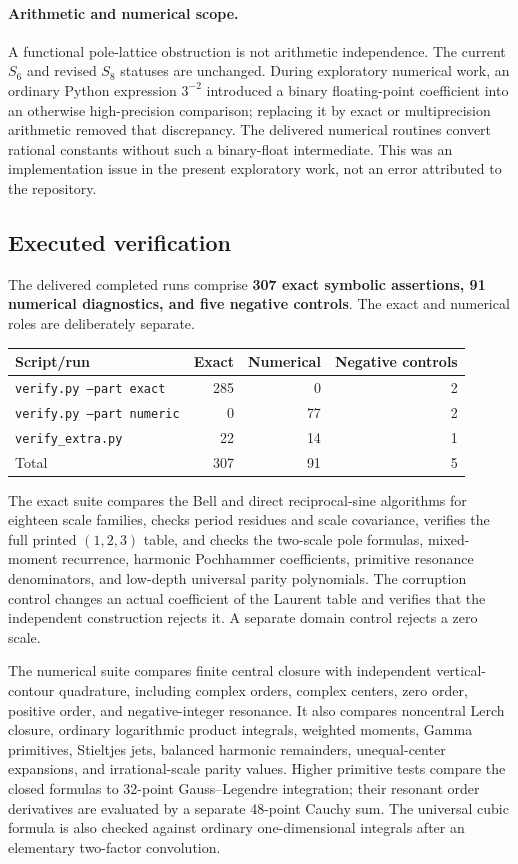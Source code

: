 \documentclass[11pt,a4paper]{article}
\numberwithin{equation}{section}
\theoremstyle{definition}\newtheorem{definition}[theorem]{Definition}
\theoremstyle{remark}\newtheorem{remark}[theorem]{Remark}
\begin{document}
\paragraph{Arithmetic and numerical scope.}
A functional pole-lattice obstruction is not arithmetic independence.
The current $S_6$ and revised $S_8$ statuses are unchanged. During
exploratory numerical work, an ordinary Python expression $3^{-2}$
introduced a binary floating-point coefficient into an otherwise
high-precision comparison; replacing it by exact or multiprecision
arithmetic removed that discrepancy. The delivered numerical routines
convert rational constants without such a binary-float intermediate.
This was an implementation issue in the present exploratory work, not
an error attributed to the repository.

\subsection{Executed verification}
The delivered completed runs comprise \textbf{307 exact symbolic
assertions, 91 numerical diagnostics, and five negative controls}.
The exact and numerical roles are deliberately separate.
\begin{center}
\begin{tabular}{l r r r}
\toprule
Script/run & Exact & Numerical & Negative controls\\
\midrule
\texttt{verify.py --part exact} & 285 & 0 & 2\\
\texttt{verify.py --part numeric} & 0 & 77 & 2\\
\texttt{verify\_extra.py} & 22 & 14 & 1\\
\midrule
Total & 307 & 91 & 5\\
\bottomrule
\end{tabular}
\end{center}
The exact suite compares the Bell and direct reciprocal-sine algorithms
for eighteen scale families, checks period residues and scale covariance,
verifies the full printed $(1,2,3)$ table, and checks the two-scale pole
formulas, mixed-moment recurrence, harmonic Pochhammer coefficients,
primitive resonance denominators, and low-depth universal parity
polynomials. The corruption control changes an actual coefficient of
the Laurent table and verifies that the independent construction rejects
it. A separate domain control rejects a zero scale.

The numerical suite compares finite central closure with independent
vertical-contour quadrature, including complex orders, complex centers,
zero order, positive order, and negative-integer resonance. It also
compares noncentral Lerch closure, ordinary logarithmic product integrals,
weighted moments, Gamma primitives, Stieltjes jets, balanced harmonic
remainders, unequal-center expansions, and irrational-scale parity
values. Higher primitive tests compare the closed formulas to
32-point Gauss--Legendre integration; their resonant order derivatives
are evaluated by a separate 48-point Cauchy sum. The universal cubic
formula is also checked against ordinary one-dimensional integrals
after an elementary two-factor convolution.
\end{document}
